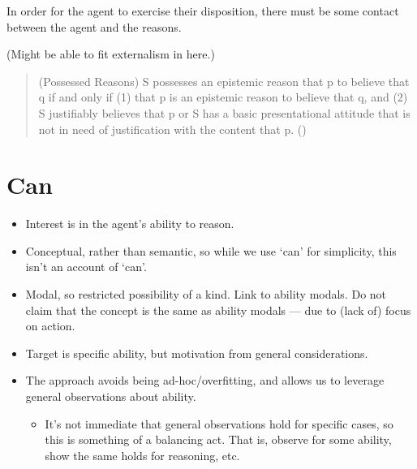 \documentclass[10pt]{article}
\begin{document}
In order for the agent to exercise their disposition, there must be some contact between the agent and the reasons.

(Might be able to fit externalism in here.)

\begin{quote}
  (Possessed Reasons) S possesses an epistemic reason that p to believe that q if and only if (1) that p is an epistemic reason to believe that q, and (2) S justiﬁably believes that p or S has a basic presentational attitude that is not in need of justiﬁcation with the content that p.\nolinebreak
  \mbox{}\hfill\mbox{(\citeyear[5]{Schmidt:2019aa})}
\end{quote}



\section{Can}
\label{sec:can}

\begin{itemize}
\item Interest is in the agent's ability to reason.
\item Conceptual, rather than semantic, so while we use `can' for simplicity, this isn't an account of `can'.
\item Modal, so restricted possibility of a kind.
  Link to ability modals.
  Do not claim that the concept is the same as ability modals --- due to (lack of) focus on action.
\item Target is specific ability, but motivation from general considerations.
\item The approach avoids being ad-hoc/overfitting, and allows us to leverage general observations about ability.
  \begin{itemize}
  \item It's not immediate that general observations hold for specific cases, so this is something of a balancing act.
    That is, observe for some ability, show the same holds for reasoning, etc.\
  \end{itemize}
\end{itemize}
\end{document}
